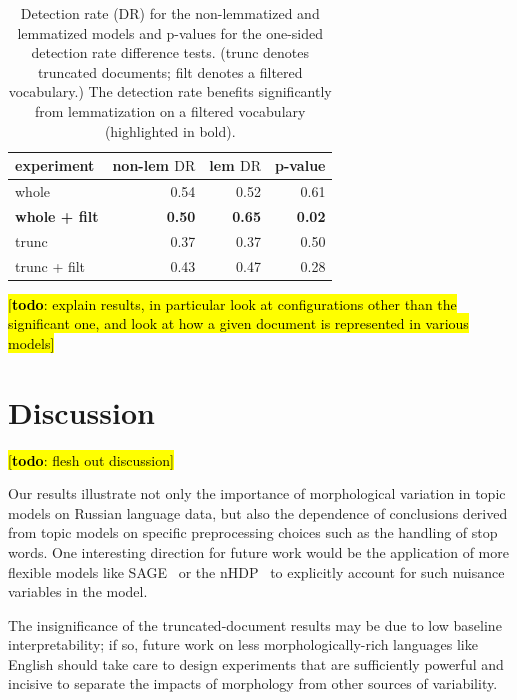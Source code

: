 \documentclass[11pt,letterpaper]{article}
\newcommand{\DR}{\ensuremath{\textrm{DR}}}
\newcommand{\Note}[3]{\sethlcolor{#2}\hl{[\textbf{#1}: #3]}}
\newcommand{\todo}[1]{\Note{todo}{red}{#1}}
\begin{document}
{\begin{table}
    \begin{tabular}{l|rr|r}
        experiment            & non-lem $\DR$ &     lem $\DR$ &       p-value \\\hline
        whole                 &          0.54 &          0.52 &          0.61 \\
        \textbf{whole + filt} & \textbf{0.50} & \textbf{0.65} & \textbf{0.02} \\
        trunc                 &          0.37 &          0.37 &          0.50 \\
        trunc + filt          &          0.43 &          0.47 &          0.28 \\
    \end{tabular}
    \caption{Detection rate ($\DR$) for the non-lemmatized and
        lemmatized models
        and p-values for the one-sided detection rate difference tests.
        (trunc denotes truncated documents; filt denotes a filtered
        vocabulary.)
        The detection rate benefits significantly from lemmatization on
        a filtered vocabulary (highlighted in bold).}
    \label{tab:detection-rate}
\end{table}

\todo{explain results, in particular look at configurations other than
    the significant one, and look at how a given document is
    represented in various models}


\section{Discussion}\label{sec:discussion}

\todo{flesh out discussion}

Our results illustrate not only the importance of morphological
variation in topic models on Russian language data, but also the
dependence of conclusions derived from topic models on specific
preprocessing choices such as the handling of stop words.  One
interesting direction for future work would be the application of more
flexible models like SAGE~\cite{eisenstein2011} or the
nHDP~\cite{paisley2015} to explicitly account for such nuisance
variables in the model.

The insignificance of the truncated-document
results may be due to low baseline interpretability; if so, future work
on less morphologically-rich languages like English should take care
to design experiments that are sufficiently powerful and incisive to
separate the impacts of morphology from other sources of variability.


}
\end{document}
